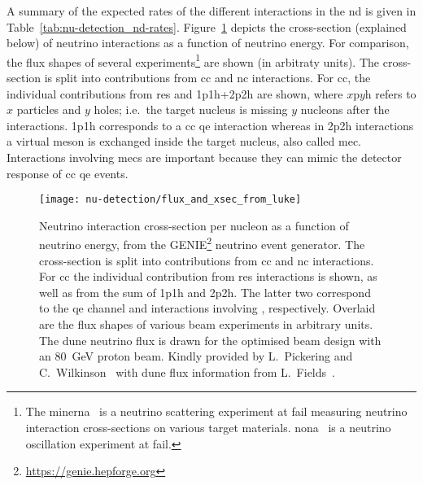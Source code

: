 A summary of the expected rates of the different interactions in the \dune{} \gls{nd} is given in Table~\ref{tab:nu-detection_nd-rates}.
Figure~\ref{fig:nu-detection_xsec_flux} depicts the cross-section (explained below) of neutrino interactions as a function of neutrino energy.
For comparison, the flux shapes of several experiments\footnote{The \acrfull{minerna}~\cite{minerna} is a neutrino scattering experiment at \acrshort{fail} measuring neutrino interaction cross-sections on various target materials. \acrfull{nona}~\cite{nona} is a neutrino oscillation experiment at \acrshort{fail}.} are shown (in arbitraty units).
The cross-section is split into contributions from \gls{cc} and \gls{nc} interactions.
For \gls{cc}, the individual contributions from \gls{res} and 1p1h+2p2h are shown, where $x$p$y$h refers to $x$ particles and $y$ holes; i.e.\ the target nucleus is missing $y$ nucleons after the interactions.
1p1h corresponds to a \gls{cc} \gls{qe} interaction whereas in 2p2h interactions a virtual meson is exchanged inside the target nucleus, also called \gls{mec}.
Interactions involving \glspl{mec} are important because they can mimic the detector response of \gls{cc} \gls{qe} events.

\begin{figure}[htb]
	\begin{minipage}{\textwidth}
		\centering
		\texttt{[image: nu-detection/flux\_and\_xsec\_from\_luke]}
		\caption[Neutrino interaction cross-section and beam fluxes]{%
			Neutrino interaction cross-section per nucleon as a function of neutrino energy, from the GENIE\footnote{\url{https://genie.hepforge.org}} neutrino event generator.
			The cross-section is split into contributions from \acrshort{cc} and \acrshort{nc} interactions.
			For \acrshort{cc} the individual contribution from \acrshort{res} interactions is shown, as well as from the sum of 1p1h and 2p2h.
			The latter two correspond to the \acrshort{qe} channel and interactions involving , respectively.
			Overlaid are the flux shapes of various beam experiments in arbitrary units.
			The \acrshort{dune} neutrino flux is drawn for the optimised beam design with an \SI{80}{\giga\electronvolt} proton beam.
			Kindly provided by L.\ Pickering and C.\ Wilkinson~\cite{xsec_luke} with \acrshort{dune} flux information from L.\ Fields~\cite{lauraNDRates}.
		}
		\label{fig:nu-detection_xsec_flux}
	\end{minipage}
\end{figure}

